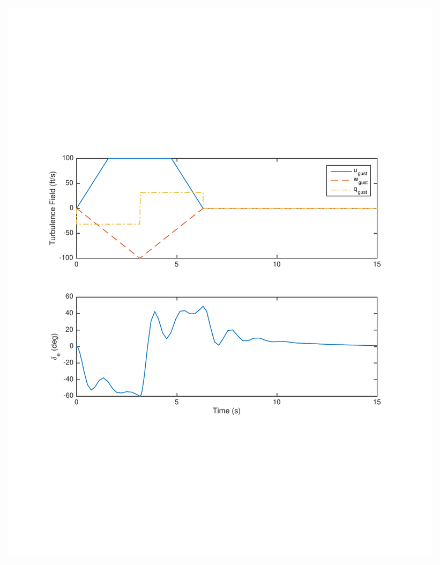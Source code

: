 \documentclass[12pt]{article}
\begin{document}
\begin{figure}[h]
\begin{center}
\includegraphics[width=1\textwidth]{figures/inputs}
\end{center}
\end{figure}
\end{document}

